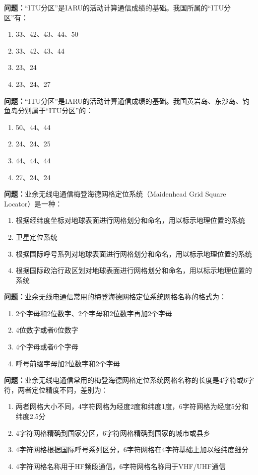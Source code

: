 \bigskip


\noindent\textbf{问题：}“ITU分区”是IARU的活动计算通信成绩的基础。我国所属的“ITU分区”有：
\begin{enumerate}[label=\Alph*), leftmargin=3em]
\item 33、42、43、44、50
\item 33、42、43、44
\item 23、24
\item 23、24、27
\end{enumerate}

\bigskip


\noindent\textbf{问题：}“ITU分区”是IARU的活动计算通信成绩的基础。我国黄岩岛、东沙岛、钓鱼岛分别属于“ITU分区”的：
\begin{enumerate}[label=\Alph*), leftmargin=3em]
\item 50、44、44
\item 24、24、25
\item 44、44、44
\item 27、24、24
\end{enumerate}

\bigskip


\noindent\textbf{问题：}业余无线电通信梅登海德网格定位系统（Maidenhead Grid Square Locator）是一种：
\begin{enumerate}[label=\Alph*), leftmargin=3em]
\item 根据经纬度坐标对地球表面进行网格划分和命名，用以标示地理位置的系统
\item 卫星定位系统
\item 根据国际呼号系列对地球表面进行网格划分和命名，用以标示地理位置的系统
\item 根据国际政治行政区划对地球表面进行网格划分和命名，用以标示地理位置的系统
\end{enumerate}

\bigskip


\noindent\textbf{问题：}业余无线电通信常用的梅登海德网格定位系统网格名称的格式为：
\begin{enumerate}[label=\Alph*), leftmargin=3em]
\item 2个字母和2位数字、2个字母和2位数字再加2个字母
\item 4位数字或者6位数字
\item 4个字母或者6个字母
\item 呼号前缀字母加2位数字和2个字母
\end{enumerate}

\bigskip


\noindent\textbf{问题：}业余无线电通信常用的梅登海德网格定位系统网格名称的长度是4字符或6字符，两者定位精度不同，差别为：
\begin{enumerate}[label=\Alph*), leftmargin=3em]
\item 两者网格大小不同，4字符网格为经度2度和纬度1度，6字符网格为经度5分和纬度2.5分
\item 4字符网格精确到国家分区，6字符网格精确到国家的城市或县乡
\item 4字符网格根据国际呼号系列区分，6字符网格在4字符基础上加以经纬度细分
\item 4字符网格名称用于HF频段通信，6字符网格名称用于VHF/UHF通信
\end{enumerate}


